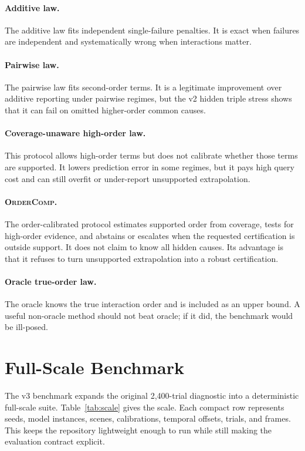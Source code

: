 \documentclass{article}
\newcommand{\method}{\textsc{OrderComp}}
\begin{document}
\paragraph{Additive law.}
The additive law fits independent single-failure penalties. It is exact when failures are independent and systematically wrong when interactions matter.

\paragraph{Pairwise law.}
The pairwise law fits second-order terms. It is a legitimate improvement over additive reporting under pairwise regimes, but the v2 hidden triple stress shows that it can fail on omitted higher-order common causes.

\paragraph{Coverage-unaware high-order law.}
This protocol allows high-order terms but does not calibrate whether those terms are supported. It lowers prediction error in some regimes, but it pays high query cost and can still overfit or under-report unsupported extrapolation.

\paragraph{\method.}
The order-calibrated protocol estimates supported order from coverage, tests for high-order evidence, and abstains or escalates when the requested certification is outside support. It does not claim to know all hidden causes. Its advantage is that it refuses to turn unsupported extrapolation into a robust certification.

\paragraph{Oracle true-order law.}
The oracle knows the true interaction order and is included as an upper bound. A useful non-oracle method should not beat oracle; if it did, the benchmark would be ill-posed.

\section{Full-Scale Benchmark}

The v3 benchmark expands the original 2,400-trial diagnostic into a deterministic full-scale suite. Table~\ref{tab:scale} gives the scale. Each compact row represents seeds, model instances, scenes, calibrations, temporal offsets, trials, and frames. This keeps the repository lightweight enough to run while still making the evaluation contract explicit.
\end{document}
